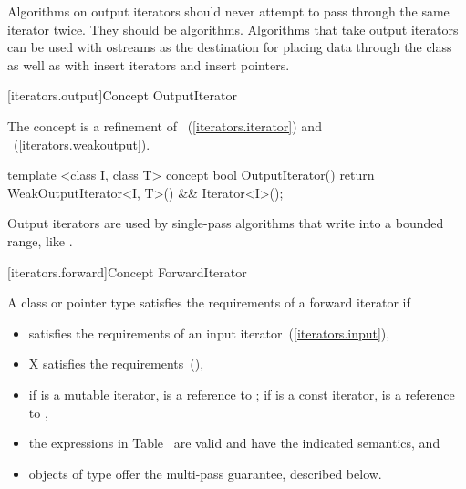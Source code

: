 \pnum
\enternote
{}
\textit{}
Algorithms on output iterators should never attempt to pass through the same iterator twice.
They should be
algorithms.
Algorithms that take output iterators can be used with ostreams as the destination
for placing data through the
class as well as with insert iterators and insert pointers.
\exitnote

\begin{addedblock}
[iterators.output]{Concept OutputIterator}

\pnum
The  concept is a refinement of ~(\ref{iterators.iterator}) and
~(\ref{iterators.weakoutput}).

%
\begin{codeblock}
  template <class I, class T>
  concept bool OutputIterator() {
    return WeakOutputIterator<I, T>() && Iterator<I>();
  }
\end{codeblock}

\pnum
\enternote Output iterators are used by single-pass
algorithms that write into a bounded range, like .
\exitnote

\end{addedblock}

[iterators.forward]{Concept ForwardIterator}

\begin{removedblock}
\pnum
A class or pointer type
satisfies the requirements of a forward iterator if

\begin{itemize}
\item {} satisfies the requirements of an input iterator~(\ref{iterators.input}),

\item X satisfies the 
requirements~(),

\item if  is a mutable iterator,  is a reference to ;
if  is a const iterator,  is a reference to ,

\item the expressions in Table~
are valid and have the indicated semantics, and

\item objects of type  offer the multi-pass guarantee, described below.
\end{itemize}
\end{removedblock}

